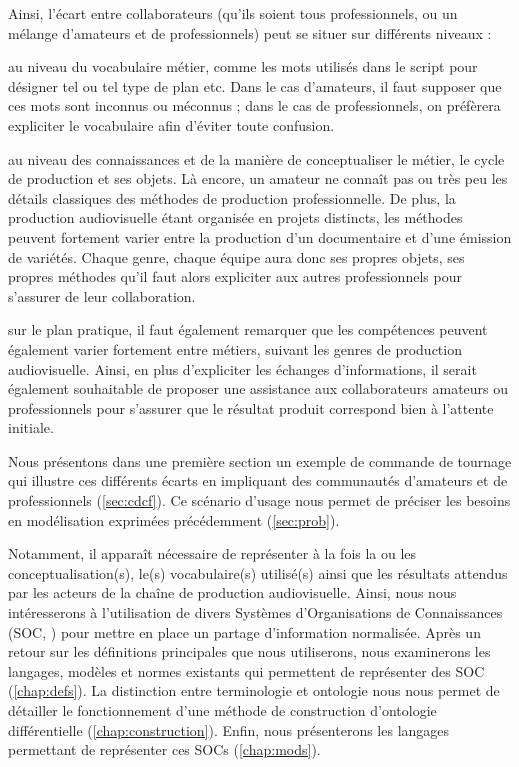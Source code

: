 Ainsi, l'écart entre collaborateurs (qu'ils soient tous professionnels, ou un mélange d'amateurs et de professionnels) peut se situer sur différents niveaux : 
\begin{liste} 
	\item au niveau du vocabulaire métier, comme les mots utilisés dans le script pour désigner tel ou tel type de plan etc. 
	Dans le cas d'amateurs, il faut supposer que ces mots sont inconnus ou méconnus ; dans le cas de professionnels, on préfèrera expliciter le vocabulaire afin d'éviter toute confusion. 
	
	\item au niveau des connaissances et de la manière de conceptualiser le métier, le cycle de production et ses objets. 
	Là encore, un amateur ne connaît pas ou très peu les détails classiques des méthodes de production professionnelle. 
	De plus, la production audiovisuelle étant organisée en projets distincts, les méthodes peuvent fortement varier entre la production d'un documentaire et d'une émission de variétés. 
	Chaque genre, chaque équipe aura donc ses propres objets, ses propres méthodes qu'il faut alors expliciter aux autres professionnels pour s'assurer de leur collaboration. 

	\item sur le plan pratique, il faut également remarquer que les compétences peuvent également varier fortement entre métiers, suivant les genres de production audiovisuelle. 
	Ainsi, en plus d'expliciter les échanges d'informations, il serait également souhaitable de proposer une assistance aux collaborateurs amateurs ou professionnels pour s'assurer que le résultat produit correspond bien à l'attente initiale. 	
\end{liste}


Nous présentons dans une première section un exemple de commande de tournage qui illustre ces différents écarts en impliquant des communautés d'amateurs et de professionnels (\ref{sec:cdcf}). 
Ce scénario d'usage nous permet de préciser les besoins en modélisation exprimées précédemment (\ref{sec:prob}).

Notamment, il apparaît nécessaire de représenter à la fois la ou les conceptualisation(s), le(s) vocabulaire(s) utilisé(s) ainsi que les résultats attendus par les acteurs de la chaîne de production audiovisuelle. 
Ainsi, nous nous intéresserons à l'utilisation de divers Systèmes d'Organisations de Connaissances (SOC, \cite{Zacklad2010}) pour mettre en place un partage d'information normalisée. 
Après un retour sur les définitions principales que nous utiliserons, nous examinerons les langages, modèles et normes existants qui permettent de représenter des SOC (\ref{chap:defs}).
La distinction entre terminologie et ontologie nous nous permet de détailler le fonctionnement d'une méthode de construction d'ontologie différentielle (\ref{chap:construction}).
Enfin, nous présenterons les langages permettant de représenter ces SOCs (\ref{chap:mods}). 

